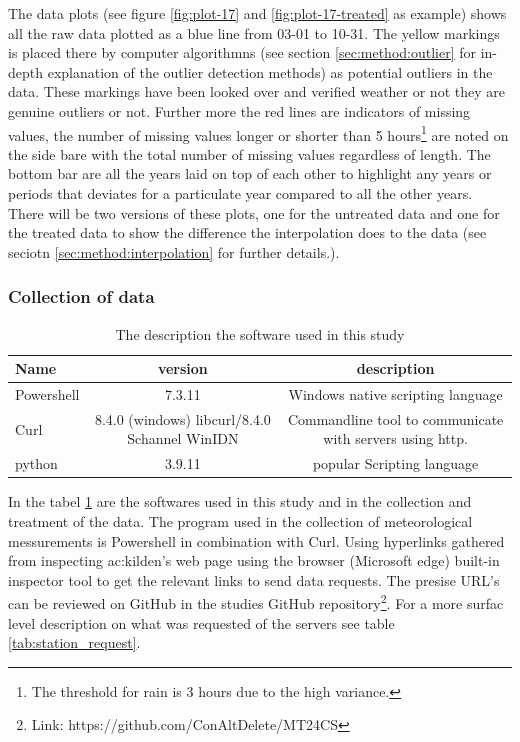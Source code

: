 The data plots (see figure \ref{fig:plot-17} and \ref{fig:plot-17-treated} as example) shows all the raw data plotted as a blue line from 03-01 to 10-31. The yellow markings is placed there by computer algorithmns (see section \ref{sec:method:outlier} for in-depth explanation of the outlier detection methods) as potential outliers in the data. These markings have been looked over and verified weather or not they are genuine outliers or not. Further more the red lines are indicators of missing values, the number of missing values longer or shorter than 5 hours\footnote{The threshold for rain is 3 hours due to the high variance.} are noted on the side bare with the total number of missing values regardless of length. The bottom bar are all the years laid on top of each other to highlight any years or periods that deviates for a particulate year compared to all the other years. There will be two versions of these plots, one for the untreated data and one for the treated data to show the difference the interpolation does to the data (see seciotn \ref{sec:method:interpolation} for further details.).

\subsubsection{Collection of data}

\begin{table}
	\begin{tabular}{lcc}
		Name       &                    version                    &                       description                        \\ \hline
		Powershell &                    7.3.11                     &            Windows native scripting language             \\
		Curl       & 8.4.0 (windows) libcurl/8.4.0 Schannel WinIDN & Commandline tool to communicate with servers using http. \\
		python     &                    3.9.11                     &                popular Scripting language
	\end{tabular}
	\caption[software version description]{The description the software used in this study}
	\label{tab:software}
\end{table}

In the tabel \ref{tab:software} are the softwares used in this study and in the collection and treatment of the data. The program used in the collection of meteorological messurements is Powershell in combination with Curl. Using hyperlinks gathered from inspecting \acrshort{ac:kilden}'s web page using the browser (Microsoft edge) built-in inspector tool to get the relevant links to send data requests. The presise URL's can be reviewed on GitHub in the studies GitHub repository\footnote{Link: https://github.com/ConAltDelete/MT24CS}. For a more surfac level description on what was requested of the servers see table \ref{tab:station_request}.

